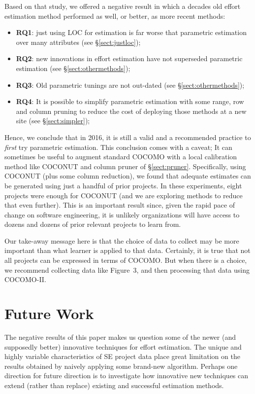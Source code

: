 \documentclass[smallcondesed]{svjour3}
\newcommand{\bi}{\begin{itemize}[leftmargin=0.4cm]}
\newcommand{\ei}{\end{itemize}}
\newcommand{\tion}[1]{\S\ref{sect:#1}}
\begin{document}
Based on that study, we offered a negative result in which a decades
old effort estimation method performed as well, or better,
as more recent methods:
\bi
\item {\bf RQ1}: just using LOC for estimation is far worse
that parametric estimation over many attributes (see \tion{justloc}); 
\item {\bf RQ2}: new innovations in effort estimation have not superseded parametric estimation (see \tion{othermethods});
\item {\bf RQ3}: Old parametric tunings are not out-dated (see \tion{othermethods});
\item {\bf RQ4}: It is possible to simplify parametric estimation with some range, row and column pruning to reduce the cost
of deploying those methods at a new site (see \tion{simpler});
\ei
Hence, we conclude that in 2016, it is still a valid and a recommended practice to {\em first} try parametric estimation. This conclusion comes with a caveat; It can sometimes be useful to augment standard COCOMO with 
a local calibration method like COCONUT
and   column pruner of \tion{pruner}. 
Specifically, 
using COCONUT (plus some column reduction), we found that adequate estimates can be generated using
just a handful of prior projects.
In these experiments, eight projects were enough for COCONUT (and we are exploring methods
to reduce that even further). This is an important result since, given the rapid pace of change
on software engineering, it is unlikely organizations will have access to dozens and dozens of prior
relevant projects to learn from.


Our take-away message here is that the choice of data to collect may be more
important than what learner is applied to that data. Certainly, it is true that
not all projects can be expressed in terms of COCOMO. But when there is a choice,
we recommend collecting data like Figure~3, and then processing that data using COCOMO-II.

 

\section{Future Work}

The negative results of this paper makes us question 
some of the newer (and supposedly better) innovative techniques for effort estimation.  
The unique and highly variable characteristics of SE
project data place great limitation on the results
obtained by naively applying some brand-new
algorithm.  Perhaps one direction for future direction is to
investigate how innovative new techniques can extend
(rather than replace) existing and successful
estimation methods.  
 
\end{document}
